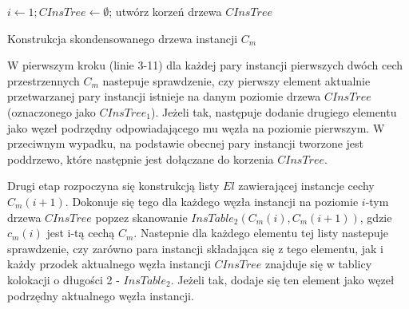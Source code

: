 \documentclass[12pt]{article}
\begin{document}
\begin{algorithm}
$ i \leftarrow 1; CInsTree \leftarrow \emptyset$; utwórz korzeń drzewa $ CInsTree $\;
\caption{Konstrukcja skondensowanego drzewa instancji $ C_{m} $}
\end{algorithm}

W pierwszym kroku (linie 3-11) dla każdej pary instancji pierwszych dwóch cech przestrzennych $ C_{m} $ nastepuje sprawdzenie, czy pierwszy element aktualnie przetwarzanej pary instancji istnieje na danym poziomie drzewa $ CInsTree $ (oznaczonego jako $CInsTree_{1}$). Jeżeli tak, następuje dodanie drugiego elementu jako węzeł podrzędny odpowiadającego mu węzła na poziomie pierwszym. W przeciwnym wypadku, na podstawie obecnej pary instancji tworzone jest poddrzewo, które następnie jest dołączane do korzenia $ CInsTree $. 

Drugi etap rozpoczyna się konstrukcją listy $ El$ zawierającej instancje cechy $ C_{m}(i+1) $. Dokonuje się tego dla każdego węzła instancji na poziomie $i$-tym drzewa $CInsTree$ popzez skanowanie $ InsTable_{2}(C_{m}(i),C_{m}(i+1))$, gdzie $ c_{m}(i)$ jest i-tą cechą $ C_{m} $. Nastepnie dla każdego elementu tej listy nastepuje sprawdzenie, czy zarówno para instancji składająca się z tego elementu, jak i każdy przodek aktualnego węzła instancji $ CInsTree$ znajduje się w tablicy kolokacji o długości 2 - $InsTable_{2}$. Jeżeli tak, dodaje się ten element jako węzeł podrzędny aktualnego węzła instancji.
\end{document}
